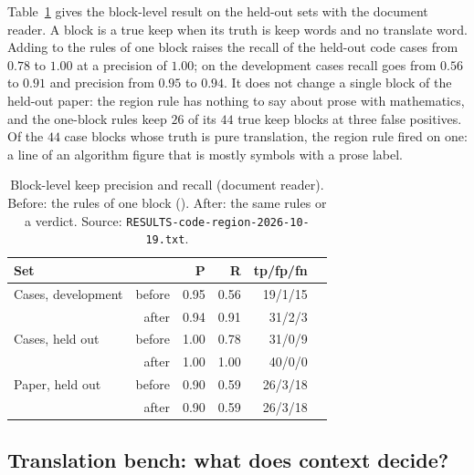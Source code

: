 Table~\ref{tab:keep} gives the block-level result on the held-out sets with the document reader. A block is a true keep when its truth is keep words and no translate
word. Adding  to the rules of one block raises the recall of the held-out code cases from $0.78$ to $1.00$ at a precision of $1.00$; on the
development cases recall goes from $0.56$ to $0.91$ and precision from $0.95$ to $0.94$. It does not change a single block of the held-out paper: the region
rule has nothing to say about prose with mathematics, and the one-block rules keep $26$ of its $44$ true keep blocks at three false positives. Of the $44$
case blocks whose truth is pure translation, the region rule fired on one: a line of an algorithm figure that is mostly symbols with a prose label.

\begin{table}[t]
\centering
\caption{Block-level keep precision and recall (document reader). Before: the rules of one block (). After:
the same rules or a  verdict. Source: \texttt{RESULTS-code-region-2026-10-19.txt}.}\label{tab:keep}
\small
\begin{tabular}{@{}lrrrrr@{}}
\toprule
Set & & P & R & tp/fp/fn\\
\midrule
Cases, development & before & 0.95 & 0.56 & 19/1/15\\
 & after & 0.94 & 0.91 & 31/2/3\\
Cases, held out & before & 1.00 & 0.78 & 31/0/9\\
 & after & 1.00 & 1.00 & 40/0/0\\
Paper, held out & before & 0.90 & 0.59 & 26/3/18\\
 & after & 0.90 & 0.59 & 26/3/18\\
\bottomrule
\end{tabular}
\end{table}

\subsection{Translation bench: what does context decide?}

